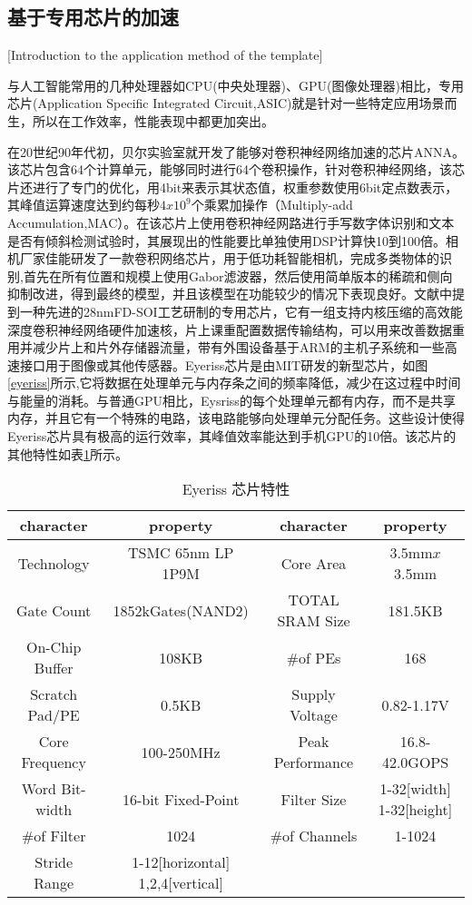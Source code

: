 \subsection{基于专用芯片的加速}[Introduction to the application method of the template]

与人工智能常用的几种处理器如CPU(中央处理器)、GPU(图像处理器)相比，专用芯片(Application Specific Integrated Circuit,ASIC)就是针对一些特定应用场景而生，所以在工作效率，性能表现中都更加突出。

在20世纪90年代初，贝尔实验室就开发了能够对卷积神经网络加速的芯片ANNA\cite{boser1991analog}。该芯片包含64个计算单元，能够同时进行64个卷积操作，针对卷积神经网络，该芯片还进行了专门的优化，用4bit来表示其状态值，权重参数使用6bit定点数表示，其峰值运算速度达到约每秒$4x10^{9}$个乘累加操作（Multiply-add Accumulation,MAC）\cite{chen2013,sackinger1992application}。在该芯片上使用卷积神经网路进行手写数字体识别和文本是否有倾斜检测试验时，其展现出的性能要比单独使用DSP计算快10到100倍。相机厂家佳能研发了一款卷积网络芯片，用于低功耗智能相机，完成多类物体的识别,首先在所有位置和规模上使用Gabor滤波器，然后使用简单版本的稀疏和侧向抑制改进，得到最终的模型，并且该模型在功能较少的情况下表现良好\cite{mutch2006multiclass}。文献\cite{desoli201714}中提到一种先进的28nmFD-SOI工艺研制的专用芯片，它有一组支持内核压缩的高效能深度卷积神经网络硬件加速核，片上课重配置数据传输结构，可以用来改善数据重用并减少片上和片外存储器流量，带有外围设备基于ARM的主机子系统和一些高速接口用于图像或其他传感器。Eyeriss芯片\cite{chen2017eyeriss}是由MIT研发的新型芯片，如图\ref{eyeriss}所示,它将数据在处理单元与内存条之间的频率降低，减少在这过程中时间与能量的消耗。与普通GPU相比，Eysriss的每个处理单元都有内存，而不是共享内存，并且它有一个特殊的电路，该电路能够向处理单元分配任务。这些设计使得Eyeriss芯片具有极高的运行效率，其峰值效率能达到手机GPU的10倍。该芯片的其他特性如表\ref{eyerisscharacter}所示。

\begin{table}[h]
\caption{Eyeriss 芯片特性}
\vspace{0.5em}\centering\wuhao
\begin{tabular}{cccc}
	\toprule[1.5pt]
		character & property & character & property\\
	\midrule[1pt]
		Technology & TSMC 65nm LP 1P9M & Core Area & 3.5mm$x$3.5mm\\
		Gate Count & 1852kGates(NAND2) & TOTAL SRAM Size & 181.5KB\\
		On-Chip Buffer & 108KB & \#of PEs & 168\\
		Scratch Pad/PE & 0.5KB & Supply Voltage & 0.82-1.17V\\
		Core Frequency & 100-250MHz & Peak Performance & 16.8-42.0GOPS\\
		Word Bit-width & 16-bit Fixed-Point & Filter Size & 1-32[width] 1-32[height]\\
		\#of Filter & 1024 & \#of Channels & 1-1024\\
		Stride Range & 1-12[horizontal] 1,2,4[vertical] & & \\
	\bottomrule[1.5pt]
\end{tabular}
\label{eyerisscharacter}
\end{table}

